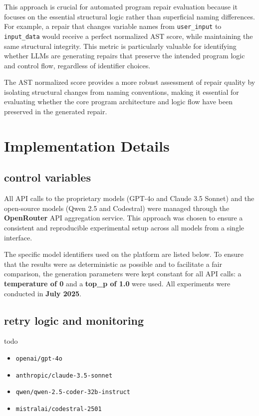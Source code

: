 This approach is crucial for automated program repair evaluation because it focuses on the essential structural logic rather than superficial naming differences. For example, a repair that changes variable names from \texttt{user\_input} to \texttt{input\_data} would receive a perfect normalized AST score, while maintaining the same structural integrity. This metric is particularly valuable for identifying whether LLMs are generating repairs that preserve the intended program logic and control flow, regardless of identifier choices.

The AST normalized score provides a more robust assessment of repair quality by isolating structural changes from naming conventions, making it essential for evaluating whether the core program architecture and logic flow have been preserved in the generated repair.

\section{Implementation Details}
\subsection{control variables}
\label{sec:implementation-details}

All API calls to the proprietary models (GPT-4o and Claude 3.5 Sonnet) and the open-source models (Qwen 2.5 and Codestral) were managed through the \textbf{OpenRouter} API aggregation service. This approach was chosen to ensure a consistent and reproducible experimental setup across all models from a single interface.

The specific model identifiers used on the platform are listed below. To ensure that the results were as deterministic as possible and to facilitate a fair comparison, the generation parameters were kept constant for all API calls: a \textbf{temperature of 0} and a \textbf{top\_p of 1.0} were used. All experiments were conducted in \textbf{July 2025}.
\subsection{retry logic and monitoring}

todo
\begin{itemize}
    \item \texttt{openai/gpt-4o}
    \item \texttt{anthropic/claude-3.5-sonnet}
    \item \texttt{qwen/qwen-2.5-coder-32b-instruct} 
    \item \texttt{mistralai/codestral-2501}
\end{itemize}

